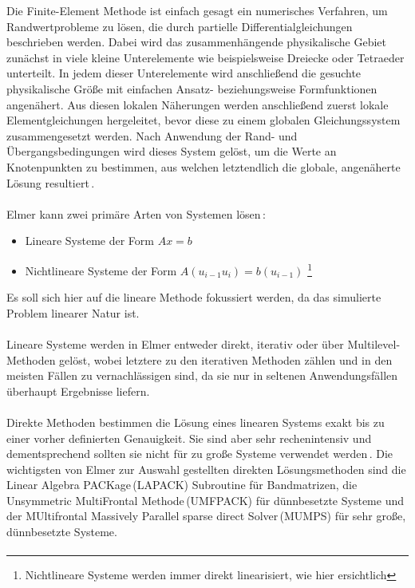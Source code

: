\documentclass[12pt, a4paper]{article}
\begin{document}
Die Finite-Element Methode ist einfach gesagt ein numerisches Verfahren, um Randwertprobleme zu lösen, die durch partielle Differentialgleichungen beschrieben werden. \newline
Dabei wird das zusammenhängende physikalische Gebiet zunächst in viele kleine Unterelemente wie beispielsweise Dreiecke oder Tetraeder unterteilt. In jedem dieser Unterelemente wird anschließend die gesuchte physikalische Größe mit einfachen Ansatz- beziehungsweise Formfunktionen angenähert. Aus diesen lokalen Näherungen werden anschließend zuerst lokale Elementgleichungen hergeleitet, bevor diese zu einem globalen Gleichungssystem zusammengesetzt werden. \newline
Nach Anwendung der Rand- und Übergangsbedingungen wird dieses System gelöst, um die Werte an Knotenpunkten zu bestimmen, aus welchen letztendlich die globale, angenäherte Lösung resultiert\,\cite{sukumar07}.\paragraph{}

Elmer kann zwei primäre Arten von Systemen lösen\,\cite{elmerSolve}:
\begin{itemize}
	\item Lineare Systeme der Form $Ax=b$
	\item Nichtlineare Systeme der Form $A(u_{i-1}u_i)=b(u_{i-1})$ \footnote{Nichtlineare Systeme werden immer direkt linearisiert, wie hier ersichtlich}
\end{itemize}
Es soll sich hier auf die lineare Methode fokussiert werden, da das simulierte Problem  linearer Natur ist.\paragraph{}

Lineare Systeme werden in Elmer entweder direkt, iterativ oder über Multilevel-Methoden gelöst, wobei letztere zu den iterativen Methoden zählen und in den meisten Fällen zu vernachlässigen sind, da sie nur in seltenen Anwendungsfällen überhaupt Ergebnisse liefern.\paragraph{}

Direkte Methoden bestimmen die Lösung eines linearen Systems exakt bis zu einer vorher definierten Genauigkeit. Sie sind aber sehr rechenintensiv und dementsprechend sollten sie nicht für zu große Systeme verwendet werden\,\cite{elmerSolve}.\newline
Die wichtigsten von Elmer zur Auswahl gestellten direkten Lösungsmethoden sind die Linear Algebra PACKage\,(LAPACK) Subroutine für Bandmatrizen, die Unsymmetric MultiFrontal Methode\,(UMFPACK) für dünnbesetzte Systeme und der MUltifrontal Massively Parallel sparse direct Solver\,(MUMPS) für sehr große, dünnbesetzte Systeme.\paragraph{}
\end{document}
